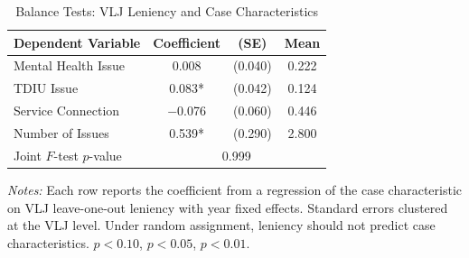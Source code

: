 
\begin{table}[H]
\centering
\caption{Balance Tests: VLJ Leniency and Case Characteristics}
\begin{threeparttable}
\begin{tabular}{lccc}
\toprule
Dependent Variable & Coefficient & (SE) & Mean \\
\midrule
Mental Health Issue & 0.008 & (0.040) & 0.222 \\
TDIU Issue & 0.083* & (0.042) & 0.124 \\
Service Connection & $-$0.076 & (0.060) & 0.446 \\
Number of Issues & 0.539* & (0.290) & 2.800 \\
\midrule
Joint $F$-test $p$-value & \multicolumn{3}{c}{0.999} \\
\bottomrule
\end{tabular}
\begin{tablenotes}[flushleft]
\small
\item \textit{Notes:} Each row reports the coefficient from a regression of the case characteristic on VLJ leave-one-out leniency with year fixed effects. Standard errors clustered at the VLJ level. Under random assignment, leniency should not predict case characteristics. \sym{*} $p<0.10$, \sym{**} $p<0.05$, \sym{***} $p<0.01$.
\end{tablenotes}
\end{threeparttable}
\label{tab:balance}
\end{table}
